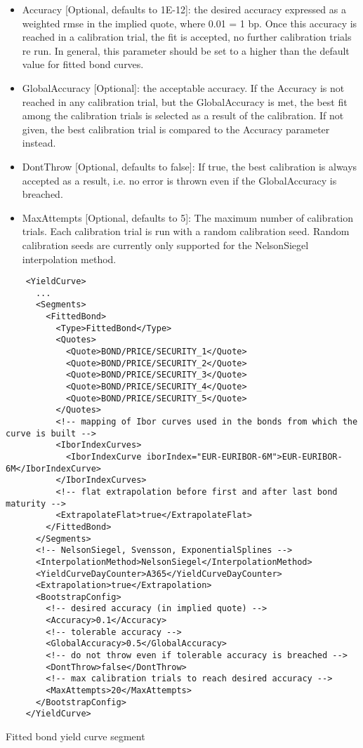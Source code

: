 \begin{itemize}
\item Accuracy [Optional, defaults to 1E-12]: the desired accuracy expressed as a weighted rmse in the implied quote,
  where 0.01 = 1 bp. Once this accuracy is reached in a calibration trial, the fit is accepted, no further calibration
  trials re run. In general, this parameter should be set to a higher than the default value for fitted bond curves.
\item GlobalAccuracy [Optional]: the acceptable accuracy. If the Accuracy is not reached in any calibration trial, but
  the GlobalAccuracy is met, the best fit among the calibration trials is selected as a result of the calibration. If
  not given, the best calibration trial is compared to the Accuracy parameter instead.
\item DontThrow [Optional, defaults to false]: If true, the best calibration is always accepted as a result, i.e. no
  error is thrown even if the GlobalAccuracy is breached.
\item MaxAttempts [Optional, defaults to 5]: The maximum number of calibration trials. Each calibration trial is run with a random calibration
  seed. Random calibration seeds are currently only supported for the NelsonSiegel interpolation method.
\end{itemize}

\begin{listing}[H]
\begin{verbatim}
    <YieldCurve>
      ...
      <Segments>
        <FittedBond>
          <Type>FittedBond</Type>
          <Quotes>
            <Quote>BOND/PRICE/SECURITY_1</Quote>
            <Quote>BOND/PRICE/SECURITY_2</Quote>
            <Quote>BOND/PRICE/SECURITY_3</Quote>
            <Quote>BOND/PRICE/SECURITY_4</Quote>
            <Quote>BOND/PRICE/SECURITY_5</Quote>
          </Quotes>
          <!-- mapping of Ibor curves used in the bonds from which the curve is built -->
          <IborIndexCurves>
            <IborIndexCurve iborIndex="EUR-EURIBOR-6M">EUR-EURIBOR-6M</IborIndexCurve>
          </IborIndexCurves>
          <!-- flat extrapolation before first and after last bond maturity -->
          <ExtrapolateFlat>true</ExtrapolateFlat>
        </FittedBond>
      </Segments>
      <!-- NelsonSiegel, Svensson, ExponentialSplines -->
      <InterpolationMethod>NelsonSiegel</InterpolationMethod>
      <YieldCurveDayCounter>A365</YieldCurveDayCounter>
      <Extrapolation>true</Extrapolation>
      <BootstrapConfig>
        <!-- desired accuracy (in implied quote) -->
        <Accuracy>0.1</Accuracy>
        <!-- tolerable accuracy -->
        <GlobalAccuracy>0.5</GlobalAccuracy>
        <!-- do not throw even if tolerable accuracy is breached -->
        <DontThrow>false</DontThrow>
        <!-- max calibration trials to reach desired accuracy -->
        <MaxAttempts>20</MaxAttempts>
      </BootstrapConfig>
    </YieldCurve>
\end{verbatim}
\caption{Fitted bond yield curve segment}
\label{lst:fitted_bond_segment}
\end{listing}
